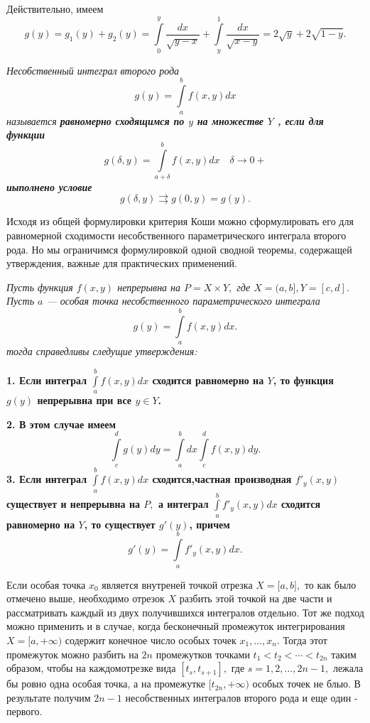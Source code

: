 Действительно, имеем
$$ g(y)=g_1(y)+g_2(y)=\int\limits_0^y \frac{dx}{\sqrt{y-x}} + \int\limits_y^1\frac{dx}{\sqrt{x-y}}=2\sqrt{y}+2\sqrt{1-y}. $$

\begin{object} \itshape Несобственный  интеграл  второго рода
$$ g(y) = \int\limits_a^b f(x,y)dx$$
называется \upshape \bfseries равномерно сходящимся по $y$ на множестве $Y$ \mdseries \itshape, если для функции
$$ g(\delta,y)=\int\limits_{a+\delta}^b f( x,y)dx \quad \delta \to 0+$$
иыполнено условие \upshape
$$ g(\delta,y)\rightrightarrows  g(0,y)= g(y). $$
\end{object}

Исходя из общей формулировки критерия Коши можно сформулировать его для равномерной сходимости несобственного параметрического интеграла второго рода. Но мы ограничимся формулировкой одной сводной теоремы, содержащей утверждения, важные для практических применений.
\medskip

\begin{theorem} \itshape Пусть функция $f(x,y)$ непрерывна на $P = X\times Y,$ где $ X = (a,b], Y = [c,d]$. Пусть $a$ --- особая точка несобственного параметрического интеграла
$$ g(y) = \int\limits_a^b f(x,y)dx.$$
тогда справедливы следущие утверждения:

\bfseries 1. \mdseries Если интеграл $\int\limits_a^b f(x,y)dx$ сходится равномерно на $Y$, то функция $g(y)$ непрерывна при все $y \in Y$.

\bfseries 2. \mdseries В этом случае имеем
$$ \int\limits_c^d g(y)dy=\int\limits_a^b dx\int\limits_c^d f(x,y)dy.$$
\bfseries 3. \mdseries Если интеграл $\int\limits_a^b f(x,y)dx$ сходится,частная производная $f'_y(x,y)$ существует и непрерывна на $P,$ а интеграл $\int\limits_a^b f'_y(x,y)dx$ сходится равномерно на $Y$, то существует $g'(y)$, причем \upshape
$$ g'(y) = \int\limits_a^b f'_y(x,y)dx. $$
\end{theorem}

Если особая точка $x_0$ является внутреней точкой отрезка $X = \lbrack a,b\rbrack,$ то как было отмечено выше, необходимо отрезок $X$ разбить этой точкой на две части и рассматривать каждый из двух получившихся интегралов отдельно. Тот же подход можно применить и в случае, когда бесконечный промежуток интегрирования $X=\lbrack a,+\infty)$ содержит конечное число особых точек $x_1,\ldots,x_n.$ Тогда этот промежуток можно разбить на $2n$ промежутков точками $t_1<t_2<\cdots<t_{2n}$ таким образом, чтобы на каждомотрезке вида $[t_s,t_{s+1}],$ где $s=1,2,\ldots,2n-1,$ лежала бы ровно одна особая точка, а на промежутке $[t_{2n},+\infty)$ особых точек не блыо. В результате получим $2n-1$ несобственных интегралов второго рода и еще один - первого. 
\bigskip

